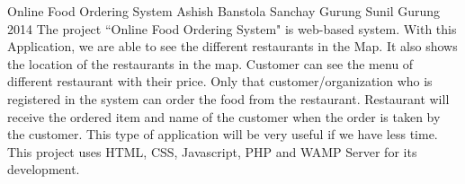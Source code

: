  \begin{conf-abstract}[]
{Online Food Ordering System}
{
Ashish Banstola
Sanchay Gurung
Sunil Gurung
}
{2014}
The project ``Online Food Ordering System" is web-based system. With this Application, we are able to see the different restaurants in the Map. It also shows the location of the restaurants in the map. Customer can see the menu of different restaurant with their price. Only that customer/organization who is registered in the system can order the food from the restaurant. Restaurant will receive the ordered item and name of the customer when the order is taken by the customer. This type of application will be very useful if we have less time. This project uses HTML, CSS, Javascript, PHP and WAMP Server for its development.
  \end{conf-abstract}